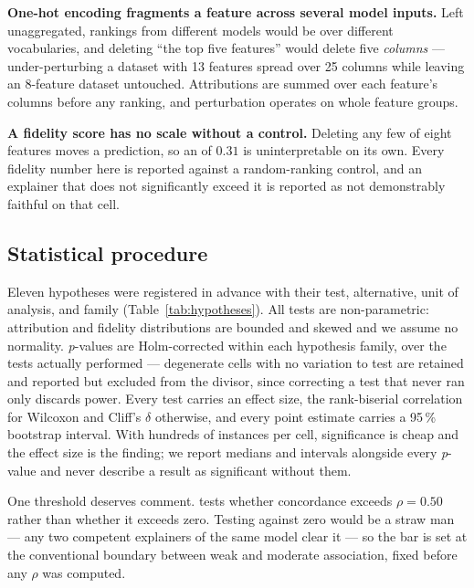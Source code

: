 \textbf{One-hot encoding fragments a feature across several model inputs.} Left
unaggregated, rankings from different models would be over different vocabularies, and
deleting ``the top five features'' would delete five \emph{columns} --- under-perturbing
a dataset with 13 features spread over 25 columns while leaving an 8-feature dataset
untouched. Attributions are summed over each feature's columns before any ranking, and
perturbation operates on whole feature groups.

\textbf{A fidelity score has no scale without a control.} Deleting any few of eight
features moves a prediction, so an \aopc{} of $0.31$ is uninterpretable on its own.
Every fidelity number here is reported against a random-ranking control, and an
explainer that does not significantly exceed it is reported as not demonstrably
faithful on that cell.

\subsection{Statistical procedure}\label{sec:method-stats}
Eleven hypotheses were registered in advance with their test, alternative, unit of
analysis, and family (Table~\ref{tab:hypotheses}). All tests are non-parametric:
attribution and fidelity distributions are bounded and skewed and we assume no
normality. \emph{p}-values are Holm-corrected within each hypothesis family, over the
tests actually performed --- degenerate cells with no variation to test are retained
and reported but excluded from the divisor, since correcting a test that never ran only
discards power. Every test carries an effect size, the rank-biserial correlation for
Wilcoxon and Cliff's $\delta$ otherwise, and every point estimate carries a 95\,\%
bootstrap interval. With hundreds of instances per cell, significance is cheap and the
effect size is the finding; we report medians and intervals alongside every
\emph{p}-value and never describe a result as significant without them.

One threshold deserves comment.  tests whether concordance exceeds $\rho=0.50$
rather than whether it exceeds zero. Testing against zero would be a straw man --- any
two competent explainers of the same model clear it --- so the bar is set at the
conventional boundary between weak and moderate association, fixed before any $\rho$
was computed.

